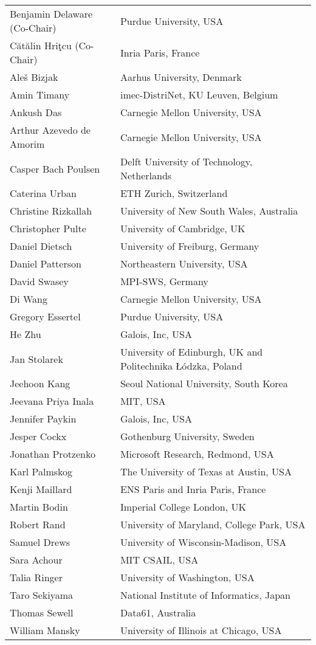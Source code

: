 \begin{tabular}{@{}p{\namewidth}l@{}}
Benjamin Delaware (Co-Chair)
  & Purdue University, USA\\
C\u{a}t\u{a}lin Hri\c{t}cu (Co-Chair)
  & Inria Paris, France \\
Aleš Bizjak
  & Aarhus University, Denmark\\
Amin Timany
  & imec-DistriNet, KU Leuven, Belgium\\
Ankush Das
  & Carnegie Mellon University, USA\\
Arthur Azevedo de Amorim
  & Carnegie Mellon University, USA\\
Casper Bach Poulsen
  & Delft University of Technology, Netherlands\\
Caterina Urban
  & ETH Zurich, Switzerland\\
Christine Rizkallah
  & University of New South Wales, Australia\\
Christopher Pulte
  & University of Cambridge, UK\\
Daniel Dietsch
  & University of Freiburg, Germany\\
Daniel Patterson
  & Northeastern University, USA\\
David Swasey
  & MPI-SWS, Germany\\
Di Wang
  & Carnegie Mellon University, USA\\
Gregory Essertel
  & Purdue University, USA\\
He Zhu
  & Galois, Inc, USA\\
Jan Stolarek
  & University of Edinburgh, UK and Politechnika Łódzka, Poland\\
Jeehoon Kang
  & Seoul National University, South Korea\\
Jeevana Priya Inala
  & MIT, USA\\
Jennifer Paykin
  & Galois, Inc, USA\\
Jesper Cockx
  & Gothenburg University, Sweden\\
Jonathan Protzenko
  & Microsoft Research, Redmond, USA\\
Karl Palmskog
  & The University of Texas at Austin, USA\\
Kenji Maillard
  & ENS Paris and Inria Paris, France\\
Martin Bodin
  & Imperial College London, UK\\
Robert Rand
  & University of Maryland, College Park, USA\\
Samuel Drews
  & University of Wisconsin-Madison, USA\\
Sara Achour
  & MIT CSAIL, USA\\
Talia Ringer
  & University of Washington, USA\\
Taro Sekiyama
  & National Institute of Informatics, Japan\\
Thomas Sewell
  & Data61, Australia\\
William Mansky
  & University of Illinois at Chicago, USA
\end{tabular}


\newpage

